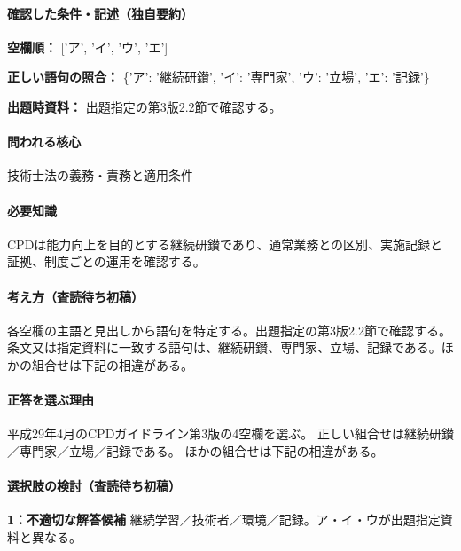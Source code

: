 \paragraph{確認した条件・記述（独自要約）}\mbox{}\par

\noindent\textbf{空欄順：} ['ア', 'イ', 'ウ', 'エ']\par

\noindent\textbf{正しい語句の照合：} \{'ア': '継続研鑚', 'イ': '専門家', 'ウ': '立場', 'エ': '記録'\}\par

\noindent\textbf{出題時資料：} 出題指定の第3版2.2節で確認する。\par

\paragraph{問われる核心} 技術士法の義務・責務と適用条件

\paragraph{必要知識} CPDは能力向上を目的とする継続研鑚であり、通常業務との区別、実施記録と証拠、制度ごとの運用を確認する。

\paragraph{考え方（査読待ち初稿）} 各空欄の主語と見出しから語句を特定する。出題指定の第3版2.2節で確認する。 条文又は指定資料に一致する語句は、継続研鑚、専門家、立場、記録である。ほかの組合せは下記の相違がある。

\paragraph{正答を選ぶ理由} 平成29年4月のCPDガイドライン第3版の4空欄を選ぶ。 正しい組合せは継続研鑚／専門家／立場／記録である。 ほかの組合せは下記の相違がある。

\paragraph{選択肢の検討（査読待ち初稿）}\mbox{}\par

\noindent\textbf{1：不適切な解答候補} 継続学習／技術者／環境／記録。ア・イ・ウが出題指定資料と異なる。\par


